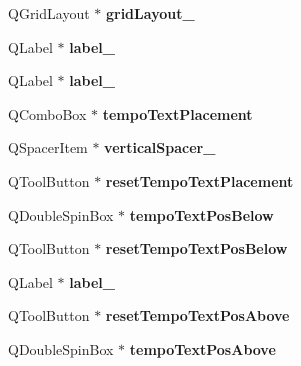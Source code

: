 \begin{DoxyCompactItemize}
Q\+Grid\+Layout $\ast$ {\bfseries grid\+Layout\+\_}
\item 
\mbox{\label{class_ui___edit_style_base_a21d6a6d5fc63cdb0ee3d293a7820d0d9}} 
Q\+Label $\ast$ {\bfseries label\+\_}
\item 
\mbox{\label{class_ui___edit_style_base_ac22040c3a3294625ae934684c4ff1753}} 
Q\+Label $\ast$ {\bfseries label\+\_}
\item 
\mbox{\label{class_ui___edit_style_base_a864e09552a4b206915854f686f990453}} 
Q\+Combo\+Box $\ast$ {\bfseries tempo\+Text\+Placement}
\item 
\mbox{\label{class_ui___edit_style_base_a815b6f390bd45dd5179e29cbbfc9b770}} 
Q\+Spacer\+Item $\ast$ {\bfseries vertical\+Spacer\+\_}
\item 
\mbox{\label{class_ui___edit_style_base_a4fe2be8ccd79000b95a1e83a53d0f927}} 
Q\+Tool\+Button $\ast$ {\bfseries reset\+Tempo\+Text\+Placement}
\item 
\mbox{\label{class_ui___edit_style_base_afa1da23f19cd76f8dc0feebca3d18e4d}} 
Q\+Double\+Spin\+Box $\ast$ {\bfseries tempo\+Text\+Pos\+Below}
\item 
\mbox{\label{class_ui___edit_style_base_a173664e2a40584ccfb793fcf3d893d7a}} 
Q\+Tool\+Button $\ast$ {\bfseries reset\+Tempo\+Text\+Pos\+Below}
\item 
\mbox{\label{class_ui___edit_style_base_a48b368f7ad634dad182b0049f7c466bd}} 
Q\+Label $\ast$ {\bfseries label\+\_}
\item 
\mbox{\label{class_ui___edit_style_base_ab0c8c45b862d54ab0ea01773b9cd2e3a}} 
Q\+Tool\+Button $\ast$ {\bfseries reset\+Tempo\+Text\+Pos\+Above}
\item 
\mbox{\label{class_ui___edit_style_base_a0e43d06b72109fa65499e40cb67648c2}} 
Q\+Double\+Spin\+Box $\ast$ {\bfseries tempo\+Text\+Pos\+Above}

\end{DoxyCompactItemize}
